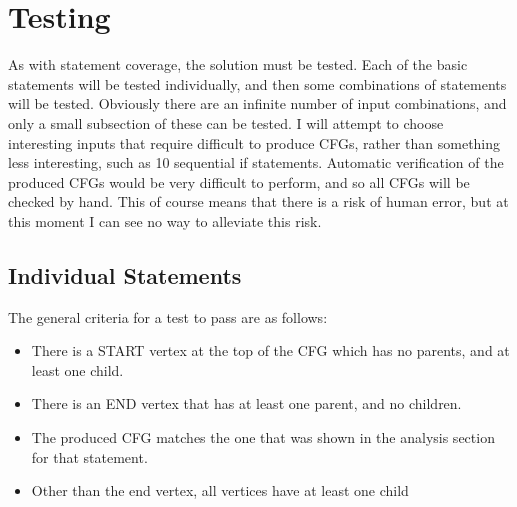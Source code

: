 \section{Testing}

As with statement coverage, the solution must be tested. Each of the basic statements will be tested individually, and then some combinations of statements will be tested. Obviously there are an infinite number of input combinations, and only a small subsection of these can be tested. I will attempt to choose interesting inputs that require difficult to produce CFGs, rather than something less interesting, such as 10 sequential if statements. Automatic verification of the produced CFGs would be very difficult to perform, and so all CFGs will be checked by hand. This of course means that there is a risk of human error, but at this moment I can see no way to alleviate this risk.

\subsection{Individual Statements}

The general criteria for a test to pass are as follows:

\begin{itemize}[nolistsep]
\item There is a START vertex at the top of the CFG which has no parents, and at least one child.
\item There is an END vertex that has at least one parent, and no children.
\item The produced CFG matches the one that was shown in the analysis section for that statement.
\item Other than the end vertex, all vertices have at least one child
\end{itemize}

\begin{figure}
\centering
\begin{minipage}[b]{.25\textwidth}
  \centering
  \caption{}
  \label{fig:testBlock}
\end{minipage}%
\begin{minipage}[b]{.25\textwidth}
  \centering
  \caption{}
  \label{fig:testIf}
\end{minipage}%
\begin{minipage}[b]{.25\textwidth}
  \centering
    \caption{}
  	\label{fig:testIfElse}
\end{minipage}
\begin{minipage}[b]{.24\textwidth}
  \centering
  \caption{}
  \label{fig:testFor}
\end{minipage}
\end{figure}

